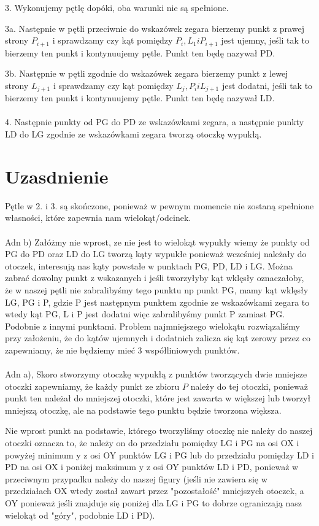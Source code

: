 \documentclass{article}
\begin{document}
3. Wykonujemy pętlę dopóki, oba warunki nie są spełnione.

3a. Następnie w pętli przeciwnie do wskazówek zegara bierzemy punkt z prawej strony $P_{i+1}$ i sprawdzamy czy kąt pomiędzy $P_{i}, L_{1} i P_{i+1}$ jest ujemny, jeśli tak to bierzemy ten punkt i kontynuujemy pętle. Punkt ten będę nazywał PD.

3b. Następnie w pętli zgodnie do wskazówek zegara bierzemy punkt z lewej strony $L_{j+1}$ i sprawdzamy czy kąt pomiędzy $L_{j}, P_{i} i L_{j+1}$ jest dodatni, jeśli tak to bierzemy ten punkt i kontynuujemy pętle. Punkt ten będę nazywał LD.
\\ \\
4. Następnie punkty od PG do PD ze wskazówkami zegara, a następnie punkty LD do LG zgodnie ze wskazówkami zegara tworzą otoczkę wypukłą.

\section{Uzasdnienie}
Pętle w 2. i 3. są skończone, ponieważ w pewnym momencie nie zostaną spełnione własności, które zapewnia nam wielokąt/odcinek.
\\ \\
Adn b) Załóżmy nie wprost, ze nie jest to wielokąt wypukły wiemy że punkty od PG do PD oraz LD do LG tworzą kąty wypukłe ponieważ wcześniej należały do otoczek, interesują nas kąty powstałe w punktach PG, PD, LD i LG. Można zabrać dowolny punkt z wskazanych i jeśli tworzyłyby kąt wklęsły oznaczałoby, że w naszej pętli nie zabralibyśmy tego punktu np punkt PG, mamy kąt wklęsły LG, PG i  P, gdzie P jest następnym punktem zgodnie ze wskazówkami zegara to wtedy kąt PG, L i P jest dodatni więc zabralibyśmy punkt P zamiast PG.
Podobnie z innymi punktami. Problem najmniejszego wielokątu rozwiązaliśmy przy założeniu, że do kątów ujemnych i dodatnich zalicza się kąt zerowy przez co zapewniamy, że nie będziemy mieć 3 współliniowych punktów.
\\ \\
Adn a), Skoro stworzymy otoczkę wypukłą z punktów tworzących dwie mniejsze otoczki zapewniamy, że każdy punkt ze zbioru $ P $ należy do tej otoczki, ponieważ punkt ten należał do mniejszej otoczki, które jest zawarta w większej lub tworzył mniejszą otoczkę, ale na podstawie tego punktu będzie tworzona większa. 

Nie wprost punkt na podstawie, którego tworzyliśmy otoczkę nie należy do naszej otoczki oznacza to, że należy on do przedziału pomiędzy LG i PG na osi OX i powyżej minimum y z osi OY punktów LG i PG lub do przedziału pomiędzy LD i PD na osi OX i poniżej maksimum y z osi OY punktów LD i PD, ponieważ w przeciwnym przypadku należy do naszej figury (jeśli nie zawiera się w przedziałach OX wtedy został zawart przez "pozostałość" mniejszych otoczek, a OY ponieważ jeśli znajduje się poniżej dla LG i PG to dobrze ograniczają nasz wielokąt od "góry", podobnie LD i PD).
\end{document}
